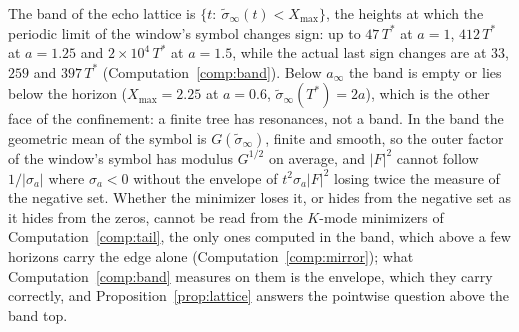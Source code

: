\documentclass[11pt]{article}
\theoremstyle{definition}
\theoremstyle{remark}
\newcommand{\Tst}{T^{*}}
\begin{document}
The band of the echo lattice is $\{t:\ \tilde\sigma_\infty(t)<X_{\max}\}$, the heights at which the periodic limit of the window's symbol changes sign: up to $47\,\Tst$ at $a=1$, $412\,\Tst$ at $a=1.25$ and $2\times10^4\,\Tst$ at $a=1.5$, while the actual last sign changes are at $33$, $259$ and $397\,\Tst$ (Computation~\ref{comp:band}). Below $a_\infty$ the band is empty or lies below the horizon ($X_{\max}=2.25$ at $a=0.6$, $\tilde\sigma_\infty(\Tst)=2a$), which is the other face of the confinement: a finite tree has resonances, not a band. In the band the geometric mean of the symbol is $G(\tilde\sigma_\infty)$, finite and smooth, so the outer factor of the window's symbol has modulus $G^{1/2}$ on average, and $|F|^2$ cannot follow $1/|\sigma_a|$ where $\sigma_a<0$ without the envelope of $t^2\sigma_a|F|^2$ losing twice the measure of the negative set. Whether the minimizer loses it, or hides from the negative set as it hides from the zeros, cannot be read from the $K$-mode minimizers of Computation~\ref{comp:tail}, the only ones computed in the band, which above a few horizons carry the edge alone (Computation~\ref{comp:mirror}); what Computation~\ref{comp:band} measures on them is the envelope, which they carry correctly, and Proposition~\ref{prop:lattice} answers the pointwise question above the band top.
\end{document}
